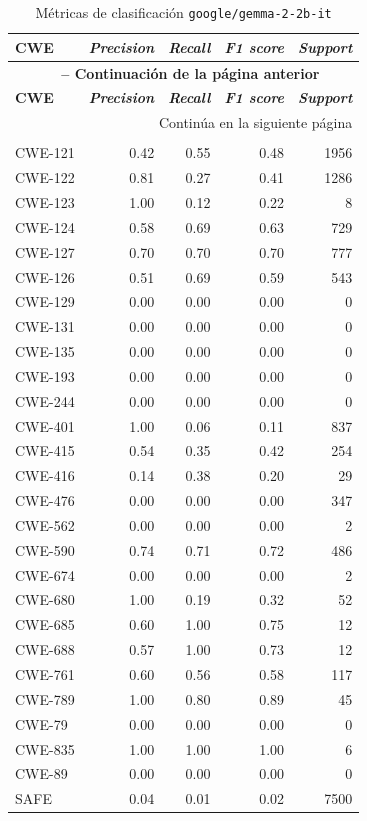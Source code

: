 \documentclass[12pt, a4paper, twoside]{article}
\begin{document}
\begin{longtable}{lrrrr}
	\caption{Métricas de clasificación \texttt{google/gemma-2-2b-it}}
	\label{fig:validation-google-gemma-2-2b-it} \\
	\toprule
	\textbf{CWE} & \textbf{\textit{Precision}} & \textbf{\textit{Recall}} & \textbf{\textit{F1 score}} & \textbf{\textit{Support}} \\
	\midrule
	\endfirsthead
	\multicolumn{5}{c}{{\bfseries \tablename\ \thetable{} -- Continuación de la página anterior}} \\
	\toprule
	\textbf{CWE} & \textbf{\textit{Precision}} & \textbf{\textit{Recall}} & \textbf{\textit{F1 score}} & \textbf{\textit{Support}} \\
	\midrule
	\endhead
	\midrule
	\multicolumn{5}{r}{Continúa en la siguiente página} \\
	\endfoot
	\midrule
	\multicolumn{5}{l}{\textbf{\textit{Global Accuracy}:} 0.24 (24\%) -- Total de pruebas: 15.000} \\
	\bottomrule
	\endlastfoot
	CWE-121 & 0.42 & 0.55 & 0.48 & 1956 \\
	CWE-122 & 0.81 & 0.27 & 0.41 & 1286 \\
	CWE-123 & 1.00 & 0.12 & 0.22 &    8 \\
	CWE-124 & 0.58 & 0.69 & 0.63 &  729 \\
	CWE-127 & 0.70 & 0.70 & 0.70 &  777 \\
	CWE-126 & 0.51 & 0.69 & 0.59 &  543 \\
	CWE-129 & 0.00 & 0.00 & 0.00 &    0 \\
	CWE-131 & 0.00 & 0.00 & 0.00 &    0 \\
	CWE-135 & 0.00 & 0.00 & 0.00 &    0 \\
	CWE-193 & 0.00 & 0.00 & 0.00 &    0 \\
	CWE-244 & 0.00 & 0.00 & 0.00 &    0 \\
	CWE-401 & 1.00 & 0.06 & 0.11 &  837 \\
	CWE-415 & 0.54 & 0.35 & 0.42 &  254 \\
	CWE-416 & 0.14 & 0.38 & 0.20 &   29 \\
	CWE-476 & 0.00 & 0.00 & 0.00 &  347 \\
	CWE-562 & 0.00 & 0.00 & 0.00 &    2 \\
	CWE-590 & 0.74 & 0.71 & 0.72 &  486 \\
	CWE-674 & 0.00 & 0.00 & 0.00 &    2 \\
	CWE-680 & 1.00 & 0.19 & 0.32 &   52 \\
	CWE-685 & 0.60 & 1.00 & 0.75 &   12 \\
	CWE-688 & 0.57 & 1.00 & 0.73 &   12 \\
	CWE-761 & 0.60 & 0.56 & 0.58 &  117 \\
	CWE-789 & 1.00 & 0.80 & 0.89 &   45 \\
	CWE-79  & 0.00 & 0.00 & 0.00 &    0 \\
	CWE-835 & 1.00 & 1.00 & 1.00 &    6 \\
	CWE-89  & 0.00 & 0.00 & 0.00 &    0 \\
	SAFE    & 0.04 & 0.01 & 0.02 & 7500 \\
\end{longtable}
\end{document}
